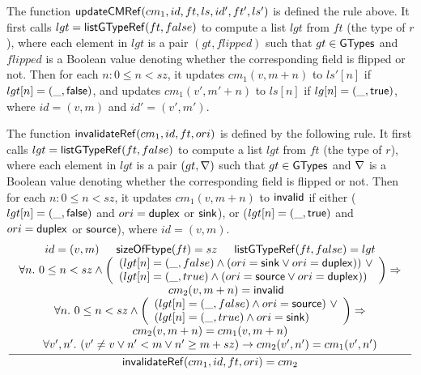 The function ${\sf updateCMRef}(cm_1, id, ft, ls, id', ft', ls')$ is defined the rule above. It first calls $lgt = {\sf listGTypeRef}(ft, false)$ to compute a list $lgt$ from $ft$ (the type of $r$), where each element in $lgt$ is a pair $(gt, flipped)$ such that $gt \in {\sf GTypes}$ and $flipped$ is a Boolean value denoting whether the corresponding field is flipped or not. Then for each $n: 0 \le n < sz$, it updates $cm_1(v, m+n)$ to $ls'[n]$ if $lgt[n] = (\_, {\sf false})$, and updates $cm_1(v', m'+n)$ to $ls[n]$ if $lg[n] = (\_, {\sf true})$, where $id = (v, m)$ and $id' = (v', m')$. 
%


The function ${\sf invalidateRef}(cm_1, id, ft, ori)$ is defined by the following rule. It first calls $lgt = {\sf listGTypeRef}(ft, false)$ to compute a list $lgt$ from $ft$ (the type of $r$), where each element in $lgt$ is a pair $(gt, \nabla)$ such that $gt \in {\sf GTypes}$ and $\nabla$ is a Boolean value denoting whether the corresponding field is flipped or not. Then for each $n: 0 \le n < sz$, it updates $cm_1(v, m+n)$ to ${\sf invalid}$ if either ($lgt[n] = (\_, {\sf false})$ and $ori = {\sf duplex}$ or ${\sf sink}$), or ($lgt[n] = (\_, {\sf true})$ and $ori = {\sf duplex}$ or ${\sf source}$), where $id = (v, m)$. 
%
\begin{gather*}
		\infer[]
		{\invalidateref(cm_1, id, ft, ori) = cm_2}
		{
			\begin{array}{c}
				id = (v, m) \hspace{15pt} \sizeofftype(ft) = sz \hspace{15pt} \listgtyperef(ft, false) = lgt \\
				\forall n.\ 0 \le n < sz \wedge 
				\left(
				\begin{array}{l}
					(lgt[n] = (\_, false) \wedge (ori = \sink \vee ori = \duplex))\ \vee \\
					(lgt[n] = (\_, true) \wedge (ori = \source \vee ori = \duplex))
				\end{array}
				\right) \Rightarrow\\
				\hspace{1cm}  cm_2(v, m+n) = \svinvalid  \\
				\forall n.\ 0 \le n < sz \wedge 
				\left(
				\begin{array}{l}
					(lgt[n] = (\_, false) \wedge ori = \source)\ \vee \\
					(lgt[n] = (\_, true) \wedge ori = \sink)
				\end{array}
				\right)  
				\Rightarrow \\
				cm_2(v, m+n) = cm_1(v, m+n)  \\
				\forall v', n'.\ (v' \neq v \vee n' < m  \vee n' \ge m+sz)  \rightarrow cm_2(v', n') = cm_1(v', n')
			\end{array}
		}
\end{gather*}


